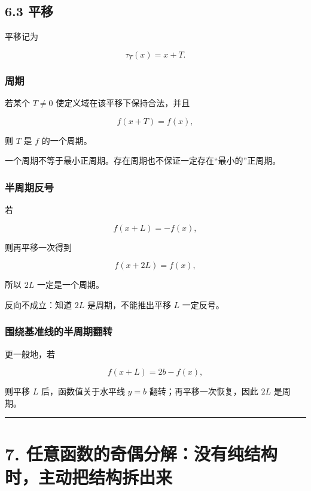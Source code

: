 \documentclass[11pt,a4paper]{ctexart}
\begin{document}
\subsection{6.3 平移}\label{ux5e73ux79fb}

平移记为

\[
\tau_T(x)=x+T.
\]

\subsubsection{周期}\label{ux5468ux671f}

若某个 \(T\ne0\) 使定义域在该平移下保持合法，并且

\[
\boxed{f(x+T)=f(x)},
\]

则 \(T\) 是 \(f\) 的一个周期。

一个周期不等于最小正周期。存在周期也不保证一定存在``最小的''正周期。

\subsubsection{半周期反号}\label{ux534aux5468ux671fux53cdux53f7}

若

\[
\boxed{f(x+L)=-f(x)},
\]

则再平移一次得到

\[
f(x+2L)=f(x),
\]

所以 \(2L\) 一定是一个周期。

反向不成立：知道 \(2L\) 是周期，不能推出平移 \(L\) 一定反号。

\subsubsection{围绕基准线的半周期翻转}\label{ux56f4ux7ed5ux57faux51c6ux7ebfux7684ux534aux5468ux671fux7ffbux8f6c}

更一般地，若

\[
\boxed{f(x+L)=2b-f(x)},
\]

则平移 \(L\) 后，函数值关于水平线 \(y=b\) 翻转；再平移一次恢复，因此
\(2L\) 是周期。

\begin{center}\rule{0.5\linewidth}{0.5pt}\end{center}

\section{7.
任意函数的奇偶分解：没有纯结构时，主动把结构拆出来}\label{ux4efbux610fux51fdux6570ux7684ux5947ux5076ux5206ux89e3ux6ca1ux6709ux7eafux7ed3ux6784ux65f6ux4e3bux52a8ux628aux7ed3ux6784ux62c6ux51faux6765}
\end{document}
